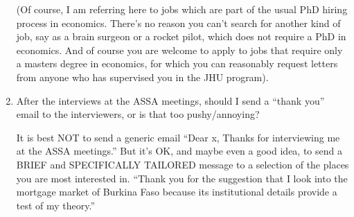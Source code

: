 \documentclass{econtex}
\begin{document}
\begin{enumerate}
(Of course, I am referring here to jobs which are part of the usual PhD hiring 
process in economics.  There's no reason you can't search for another kind of 
job, say as a brain surgeon or a rocket pilot, which does not require a 
PhD in economics.  And of course you are welcome to apply to jobs that require 
only a masters degree in economics, for which you can reasonably request letters 
from anyone who has supervised you in the JHU program).  

\item After the interviews at the ASSA meetings, should I send a ``thank you'' email to the interviewers, or is that too pushy/annoying?

  It is best NOT to send a generic email ``Dear x, Thanks for interviewing me at the ASSA meetings.''  But it's OK, and maybe even a good idea, to send a BRIEF and SPECIFICALLY TAILORED message to a selection of the places you are most interested in.  ``Thank you for the suggestion that I look into the mortgage market of Burkina Faso because its institutional details provide a test of my theory.''


\end{enumerate}
\end{document}
